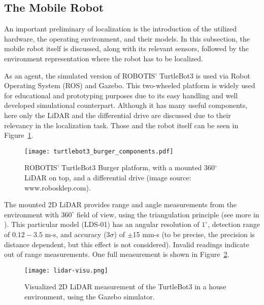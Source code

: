 \subsection{The Mobile Robot}
An important preliminary of localization is the introduction of the utilized hardware, the operating environment,
and their models.
In this subsection, the mobile robot itself is discussed, along with its relevant sensors,
followed by the environment representation where the robot has to be localized.

As an agent, the simulated version of ROBOTIS' TurtleBot3 is used via Robot Operating System (ROS) and Gazebo.
This two-wheeled platform is widely used for educational and prototyping purposes due to its easy handling
and well developed simulational counterpart. Although it has many useful components, here only the LiDAR and the
differential drive are discussed due to their relevancy in the localization task.
Those and the robot itself can be seen in Figure~\ref{fig:turtlebot3-burger}.
\begin{figure}[htbp]
    \centering
    \texttt{[image: turtlebot3\_burger\_components.pdf]}
    \caption[]{ROBOTIS' TurtleBot3 Burger platform, with a mounted 360$^\circ$ LiDAR on top, and a differential drive (image source: www.robosklep.com).}
    \label{fig:turtlebot3-burger}
\end{figure}

The mounted 2D LiDAR provides range and angle measurements from the environment with $360^\circ$ field of view,
using the triangulation principle (see more in \cite{Konolige2016}).
This particular model (LDS-01) has an angular resolution of $1^\circ$, detection range of $0.12-3.5$ m-s,
and accuracy (3$\sigma$) of $\pm$15 mm-s (to be precise, the precision is distance dependent, but this effect is not considered).
Invalid readings indicate out of range measurements. One full measurement is shown in Figure~\ref{fig:lidar-readings}.
\begin{figure}[htbp]
    \centering
    \texttt{[image: lidar-visu.png]}
    \caption{Visualized 2D LiDAR measurement of the TurtleBot3 in a house environment, using the Gazebo simulator.}
    \label{fig:lidar-readings}
\end{figure}

